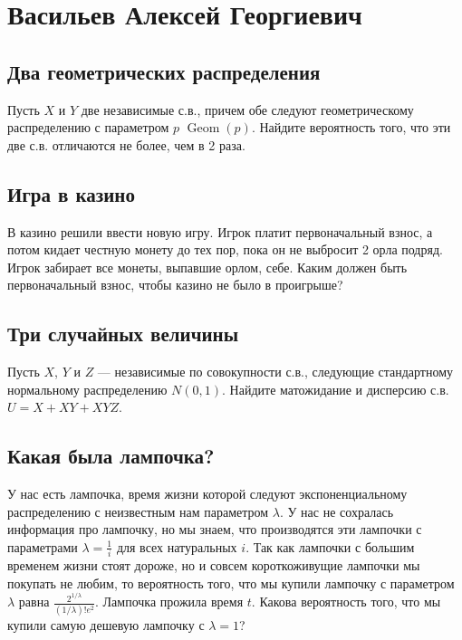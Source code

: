 \documentclass[12pt]{article}
\DeclareMathOperator{\Geom}{Geom}
\begin{document}
\newpage
\section{Васильев Алексей Георгиевич}

\subsection{Два геометрических распределения}

Пусть $X$ и $Y$ две независимые с.в., причем обе следуют геометрическому распределению с параметром $p$ $\Geom(p)$. Найдите вероятность того, что эти две с.в. отличаются не более, чем в 2 раза.



\subsection{Игра в казино}

В казино решили ввести новую игру. Игрок платит первоначальный взнос, а потом кидает честную монету до тех пор, пока он не выбросит 2 орла подряд. Игрок забирает все монеты, выпавшие орлом, себе. Каким должен быть первоначальный взнос, чтобы казино не было в проигрыше?



\subsection{Три случайных величины}

Пусть $X$, $Y$ и $Z$ --- независимые по совокупности с.в., следующие стандартному нормальному распределению $N(0, 1)$. Найдите матожидание и дисперсию с.в. $U = X + XY + XYZ$. 



\subsection{Какая была лампочка?}

У нас есть лампочка, время жизни которой следуют экспоненциальному распределению с неизвестным нам параметром $\lambda$. У нас не сохралась информация про лампочку, но мы знаем, что производятся эти лампочки с параметрами $\lambda = \frac{1}{i}$ для всех натуральных $i$. Так как лампочки с большим временем жизни стоят дороже, но и совсем короткоживущие лампочки мы покупать не любим, то вероятность того, что мы купили лампочку с параметром $\lambda$ равна $\frac{2^{1/\lambda}}{(1/\lambda)!e^2}$. Лампочка прожила время $t$. Какова вероятность того, что мы купили самую дешевую лампочку с $\lambda = 1$?
\end{document}

